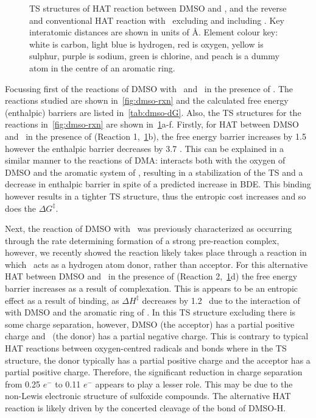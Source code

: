 \begin{figure}[!htbp]
  \caption[TS structures of HAT reaction between DMSO and \cumo, and the reverse and conventional HAT reaction with \bno\ excluding and including .]{TS structures of HAT reaction between DMSO and \cumo, and the reverse and conventional HAT reaction with \bno\ excluding and including . Key interatomic distances are shown in units of \AA. Element colour key: white is carbon, light blue is hydrogen, red is oxygen, yellow is sulphur, purple is sodium, green is chlorine, and peach is a dummy atom in the centre of an aromatic ring.}
  \label{fig:dmso-ts}
\end{figure}

Focussing first of the reactions of DMSO with \cumo\ and \bno\ in the presence of . The reactions studied are shown in~\ref{fig:dmso-rxn} and the calculated free energy (enthalpic) barriers are listed in~\ref{tab:dmso-dG}. Also, the TS structures for the reactions in~\ref{fig:dmso-rxn} are shown in~\ref{fig:dmso-ts}a-f. Firstly, for HAT between DMSO and \cumo\ in the presence of  (Reaction 1,~\ref{fig:dmso-ts}b), the free energy barrier increases by 1.5 \kcalmol\, however the enthalpic barrier decreases by 3.7 \kcalmol. This can be explained in a similar manner to the reactions of DMA:  interacts both with the oxygen of DMSO and the aromatic system of \cumo, resulting in a stabilization of the TS and a decrease in enthalpic barrier in spite of a predicted increase in  BDE. This binding however results in a tighter TS structure, thus the entropic cost increases and so does the $\Delta G^\ddagger$.

Next, the reaction of DMSO with \bno\ was previously characterized\cite{Salamone2012} as occurring through the rate determining formation of a strong pre-reaction complex, however, we recently showed the reaction likely takes place through a reaction in which \bno\ acts as a hydrogen atom donor, rather than acceptor.\cite{vanSanten2016} For this alternative HAT between DMSO and \bno\ in the presence of  (Reaction 2,~\ref{fig:dmso-ts}d) the free energy barrier increases as a result of complexation. This is appears to be an entropic effect as a result of binding, as $\Delta H^\ddagger$ decreases by 1.2 \kcalmol\ due to the interaction of  with DMSO and the aromatic ring of \bno. In this TS structure excluding  there is some charge separation, however, DMSO (the acceptor) has a partial positive charge and \bno\ (the donor) has a partial negative charge. This is contrary to typical HAT reactions between oxygen-centred radicals and  bonds where in the TS structure, the donor typically has a partial positive charge and the acceptor has a partial positive charge. Therefore, the significant reduction in charge separation from 0.25 $e^-$ to 0.11 $e^-$ appears to play a lesser role. This may be due to the non-Lewis electronic structure of sulfoxide compounds. The alternative HAT reaction is likely driven by the concerted cleavage of the  bond of DMSO-H.

